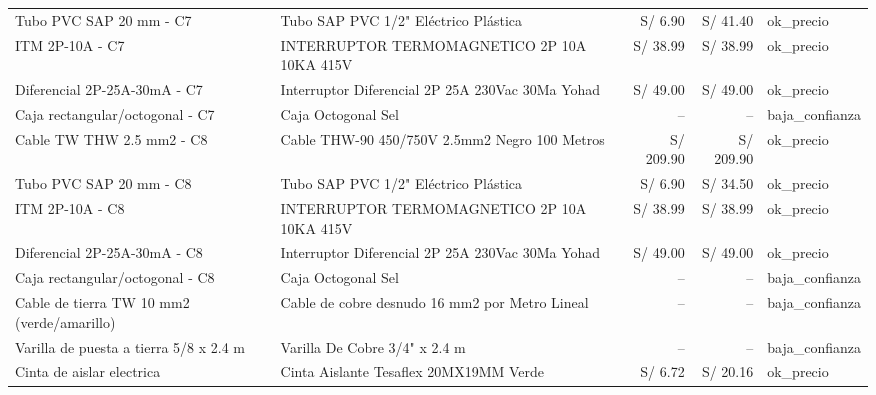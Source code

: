 \documentclass[11pt,a4paper]{article}
\begin{document}
\begin{longtable}{p{} p{} r r p{}}
Tubo PVC SAP 20 mm - C7 & Tubo SAP PVC 1/2" Eléctrico Plástica & S/ 6.90 & S/ 41.40 & ok\_precio \\
ITM 2P-10A - C7 & INTERRUPTOR TERMOMAGNETICO 2P 10A 10KA 415V & S/ 38.99 & S/ 38.99 & ok\_precio \\
Diferencial 2P-25A-30mA - C7 & Interruptor Diferencial 2P 25A 230Vac 30Ma Yohad & S/ 49.00 & S/ 49.00 & ok\_precio \\
Caja rectangular/octogonal - C7 & Caja Octogonal Sel & -- & -- & baja\_confianza \\
Cable TW THW 2.5 mm2 - C8 & Cable THW-90 450/750V 2.5mm2 Negro 100 Metros & S/ 209.90 & S/ 209.90 & ok\_precio \\
Tubo PVC SAP 20 mm - C8 & Tubo SAP PVC 1/2" Eléctrico Plástica & S/ 6.90 & S/ 34.50 & ok\_precio \\
ITM 2P-10A - C8 & INTERRUPTOR TERMOMAGNETICO 2P 10A 10KA 415V & S/ 38.99 & S/ 38.99 & ok\_precio \\
Diferencial 2P-25A-30mA - C8 & Interruptor Diferencial 2P 25A 230Vac 30Ma Yohad & S/ 49.00 & S/ 49.00 & ok\_precio \\
Caja rectangular/octogonal - C8 & Caja Octogonal Sel & -- & -- & baja\_confianza \\
Cable de tierra TW 10 mm2 (verde/amarillo) & Cable de cobre desnudo 16 mm2 por Metro Lineal & -- & -- & baja\_confianza \\
Varilla de puesta a tierra 5/8 x 2.4 m & Varilla De Cobre 3/4" x 2.4 m & -- & -- & baja\_confianza \\
Cinta de aislar electrica & Cinta Aislante Tesaflex 20MX19MM Verde & S/ 6.72 & S/ 20.16 & ok\_precio \\
\bottomrule\end{longtable}
\end{document}
